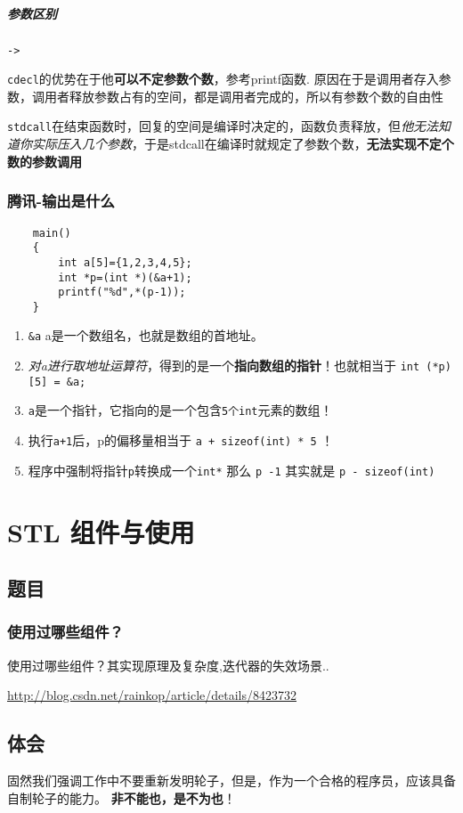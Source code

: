 \documentclass[UTF8,a4paper,8pt]{ctexart}
\begin{document}
		
			\subparagraph{参数区别}\verb|->|
			
				\verb|cdecl|的优势在于他\textbf{可以不定参数个数}，参考printf函数. 原因在于是调用者存入参数，调用者释放参数占有的空间，都是调用者完成的，所以有参数个数的自由性
			
				\verb|stdcall|在结束函数时，回复的空间是编译时决定的，函数负责释放，但\textit{他无法知道你实际压入几个参数}，于是stdcall在编译时就规定了参数个数，\textbf{无法实现不定个数的参数调用}
		
		\subsubsection{腾讯-输出是什么 }
		\begin{lstlisting}
	main()
	{
		int a[5]={1,2,3,4,5};
		int *p=(int *)(&a+1);
		printf("%d",*(p-1));
	}
		\end{lstlisting}
		
		\begin{enumerate}
			\item \verb|&a|   a是一个数组名，也就是数组的首地址。
			\item \textit{对a进行取地址运算符}，得到的是一个\textbf{指向数组的指针}！也就相当于 \verb|int (*p) [5] = &a;|
			\item \verb|a|是一个指针，它指向的是一个包含\verb|5个int|元素的数组！
			\item 执行\verb|a+1|后，p的偏移量相当于 \verb|a + sizeof(int) * 5| ！
			\item 程序中强制将指针\verb|p|转换成一个\verb|int*| 那么 \verb|p -1| 其实就是 \verb|p - sizeof(int)|
		\end{enumerate}
\newpage
\section{STL 组件与使用}
	\subsection{题目}
		\subsubsection{使用过哪些组件？} 使用过哪些组件？其实现原理及复杂度,迭代器的失效场景..
		
		\url{http://blog.csdn.net/rainkop/article/details/8423732}

	\subsection{体会}
		固然我们强调工作中不要重新发明轮子，但是，作为一个合格的程序员，应该具备自制轮子的能力。
		\textbf{非不能也，是不为也}！
		
\end{document}
